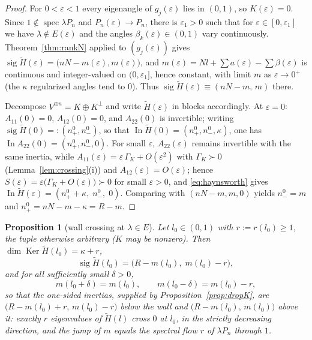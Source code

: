 \documentclass[11pt]{article}
\newtheorem{proposition}[theorem]{Proposition}
\theoremstyle{definition}
\newcommand{\Ht}{\widetilde H}
\newcommand{\Ker}{\operatorname{Ker}}
\newcommand{\sig}{\operatorname{sig}}
\begin{document}
\begin{proof}
For $0<\varepsilon<1$ every eigenangle of $g_j(\varepsilon)$ lies in
$(0,1)$, so $K(\varepsilon)=0$. Since
$1\notin\operatorname{spec}\lambda P_n$ and
$P_n(\varepsilon)\to P_n$, there is $\varepsilon_1>0$ such that for
$\varepsilon\in[0,\varepsilon_1]$ we have
$\lambda\notin E(\varepsilon)$ and the angles
$\beta_k(\varepsilon)\in(0,1)$ vary continuously.
Theorem~\ref{thm:rankN} applied to $(g_j(\varepsilon))$ gives
$\operatorname{sig}\Ht(\varepsilon)
=\bigl(nN-m(\varepsilon),m(\varepsilon)\bigr)$, and
$m(\varepsilon)=Nl+\sum a(\varepsilon)-\sum\beta(\varepsilon)$ is
continuous and integer-valued on $(0,\varepsilon_1]$, hence constant,
with limit $m$ as $\varepsilon\to0^{+}$ (the $\kappa$ regularized angles
tend to $0$). Thus
$\operatorname{sig}\Ht(\varepsilon)\equiv(nN-m,\,m)$ there.

Decompose $V^{\oplus n}=K\oplus K^{\perp}$ and write
$\Ht(\varepsilon)$ in blocks accordingly. At $\varepsilon=0$:
$A_{11}(0)=0$, $A_{12}(0)=0$, and $A_{22}(0)$ is invertible; writing
$\sig\Ht(0)=:(n_+^{0},n_-^{0})$, so that
$\operatorname{In}\Ht(0)=(n_+^{0},n_-^{0},\kappa)$, one has
$\operatorname{In}A_{22}(0)=(n_+^{0},n_-^{0},0)$.
For small $\varepsilon$, $A_{22}(\varepsilon)$ remains invertible with
the same inertia, while
$A_{11}(\varepsilon)=\varepsilon\,\Gamma_K+O(\varepsilon^{2})$ with
$\Gamma_K\succ0$ (Lemma~\ref{lem:crossing}(i)) and
$A_{12}(\varepsilon)=O(\varepsilon)$; hence
$S(\varepsilon)=\varepsilon\bigl(\Gamma_K+O(\varepsilon)\bigr)\succ0$
for small $\varepsilon>0$, and \eqref{eq:haynsworth} gives
$\operatorname{In}\Ht(\varepsilon)=(n_+^{0}+\kappa,\;n_-^{0},\;0)$.
Comparing with $(nN-m,m,0)$ yields $n_-^{0}=m$ and
$n_+^{0}=nN-m-\kappa=R-m$.
\end{proof}

\begin{proposition}[wall crossing at $\lambda\in E$]\label{prop:wall}
Let $l_0\in(0,1)$ with $r:=r(l_0)\ge1$, the tuple otherwise arbitrary
($K$ may be nonzero). Then $\dim\Ker\Ht(l_0)=\kappa+r$,
\[
\operatorname{sig}\Ht(l_0)=\bigl(R-m(l_0),\;m(l_0)-r\bigr),
\]
and for all sufficiently small $\delta>0$,
\[
m(l_0+\delta)=m(l_0),\qquad m(l_0-\delta)=m(l_0)-r ,
\]
so that the one-sided inertias, supplied by
Proposition~\ref{prop:dropK}, are
$\bigl(R-m(l_0)+r,\,m(l_0)-r\bigr)$ below the wall and
$\bigl(R-m(l_0),\,m(l_0)\bigr)$ above it: exactly $r$ eigenvalues of
$\Ht(l)$ cross $0$ at $l_0$, in the strictly decreasing direction, and
the jump of $m$ equals the spectral flow $r$ of $\lambda P_n$ through
$1$.
\end{proposition}
\end{document}
